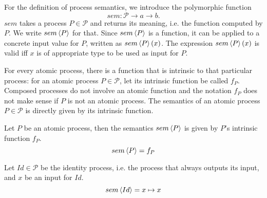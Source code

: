 For the definition of process semantics, we introduce the polymorphic function 
\begin{equation*}
  sem \colon \mathcal{P} \to a \to b.
\end{equation*}
$sem$ takes a process $P \in \mathcal{P}$ and returns its meaning, i.e. the function computed by $P$. We write $sem \left\langle P \right\rangle$ for that. Since $sem \left\langle P \right\rangle$ is a function, it can be applied to a concrete input value for $P$, written as $sem \left\langle P \right\rangle \left( x \right)$. The expression $sem \left\langle P \right\rangle \left( x \right)$ is valid iff $x$ is of appropriate type to be used as input for $P$.

For every atomic process, there is a function that is intrinsic to that particular process: for an atomic process $P \in \mathcal{P}$, let its intrinsic function be called $f_P$. Composed processes do not involve an atomic function and the notation $f_P$ does not make sense if $P$ is not an atomic process. The semantics of an atomic process $P \in \mathcal{P}$ is directly given by its intrinsic function.
\begin{definition}
  \label{def:sem_atomic}
  Let $P$ be an atomic process, then the semantics $sem \left\langle P \right\rangle$ is given by $P$'s intrinsic function $f_P$.
  \begin{equation*}
    \label{eqn:sem_atomic}
    sem \left\langle P \right\rangle = f_P
  \end{equation*}
  \vspace*{-0.25em}
  \hfill\qedsymbol
\end{definition}

\begin{definition}
\label{def:sem_id}
Let $Id \in \mathcal{P}$ be the identity process, i.e. the process that always outputs its input, and $x$ be an input for $Id$.
\begin{equation*}
  \label{eqn:sem_id}
  sem \left\langle Id \right\rangle = x \mapsto x
\end{equation*}
  \vspace*{-0.25em}
  \hfill\qedsymbol
\end{definition}


